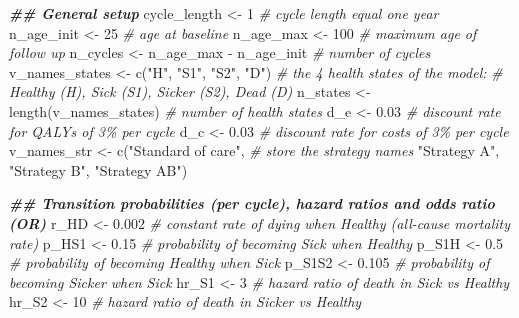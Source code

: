 \documentclass[
]{article}
\newenvironment{Shaded}{\begin{snugshade}}{\end{snugshade}}
\newcommand{\CommentTok}[1]{\textcolor[rgb]{0.56,0.35,0.01}{\textit{#1}}}
\newcommand{\DecValTok}[1]{\textcolor[rgb]{0.00,0.00,0.81}{#1}}
\newcommand{\DocumentationTok}[1]{\textcolor[rgb]{0.56,0.35,0.01}{\textbf{\textit{#1}}}}
\newcommand{\FloatTok}[1]{\textcolor[rgb]{0.00,0.00,0.81}{#1}}
\newcommand{\FunctionTok}[1]{\textcolor[rgb]{0.00,0.00,0.00}{#1}}
\newcommand{\NormalTok}[1]{#1}
\newcommand{\OtherTok}[1]{\textcolor[rgb]{0.56,0.35,0.01}{#1}}
\newcommand{\SpecialCharTok}[1]{\textcolor[rgb]{0.00,0.00,0.00}{#1}}
\newcommand{\StringTok}[1]{\textcolor[rgb]{0.31,0.60,0.02}{#1}}
\begin{document}
\begin{Shaded}
\begin{Highlighting}[]
\DocumentationTok{\#\# General setup}
\NormalTok{cycle\_length }\OtherTok{\textless{}{-}} \DecValTok{1} \CommentTok{\# cycle length equal one year}
\NormalTok{n\_age\_init }\OtherTok{\textless{}{-}} \DecValTok{25}  \CommentTok{\# age at baseline}
\NormalTok{n\_age\_max  }\OtherTok{\textless{}{-}} \DecValTok{100} \CommentTok{\# maximum age of follow up}
\NormalTok{n\_cycles }\OtherTok{\textless{}{-}}\NormalTok{ n\_age\_max }\SpecialCharTok{{-}}\NormalTok{ n\_age\_init }\CommentTok{\# number of cycles}
\NormalTok{v\_names\_states }\OtherTok{\textless{}{-}} \FunctionTok{c}\NormalTok{(}\StringTok{"H"}\NormalTok{, }\StringTok{"S1"}\NormalTok{, }\StringTok{"S2"}\NormalTok{, }\StringTok{"D"}\NormalTok{) }\CommentTok{\# the 4 health states of the model:}
                               \CommentTok{\# Healthy (H), Sick (S1), Sicker (S2), Dead (D)}
\NormalTok{n\_states }\OtherTok{\textless{}{-}} \FunctionTok{length}\NormalTok{(v\_names\_states) }\CommentTok{\# number of health states }
\NormalTok{d\_e }\OtherTok{\textless{}{-}} \FloatTok{0.03} \CommentTok{\# discount rate for QALYs of 3\% per cycle }
\NormalTok{d\_c }\OtherTok{\textless{}{-}} \FloatTok{0.03} \CommentTok{\# discount rate for costs of 3\% per cycle }
\NormalTok{v\_names\_str }\OtherTok{\textless{}{-}} \FunctionTok{c}\NormalTok{(}\StringTok{"Standard of care"}\NormalTok{, }\CommentTok{\# store the strategy names}
                 \StringTok{"Strategy A"}\NormalTok{, }
                 \StringTok{"Strategy B"}\NormalTok{,}
                 \StringTok{"Strategy AB"}\NormalTok{) }

\DocumentationTok{\#\# Transition probabilities (per cycle), hazard ratios and odds ratio (OR)}
\NormalTok{r\_HD    }\OtherTok{\textless{}{-}} \FloatTok{0.002} \CommentTok{\# constant rate of dying when Healthy (all{-}cause mortality rate)}
\NormalTok{p\_HS1   }\OtherTok{\textless{}{-}} \FloatTok{0.15}  \CommentTok{\# probability of becoming Sick when Healthy}
\NormalTok{p\_S1H   }\OtherTok{\textless{}{-}} \FloatTok{0.5}   \CommentTok{\# probability of becoming Healthy when Sick}
\NormalTok{p\_S1S2  }\OtherTok{\textless{}{-}} \FloatTok{0.105} \CommentTok{\# probability of becoming Sicker when Sick}
\NormalTok{hr\_S1   }\OtherTok{\textless{}{-}} \DecValTok{3}     \CommentTok{\# hazard ratio of death in Sick vs Healthy}
\NormalTok{hr\_S2   }\OtherTok{\textless{}{-}} \DecValTok{10}    \CommentTok{\# hazard ratio of death in Sicker vs Healthy }


\end{Highlighting}
\end{Shaded}
\end{document}
